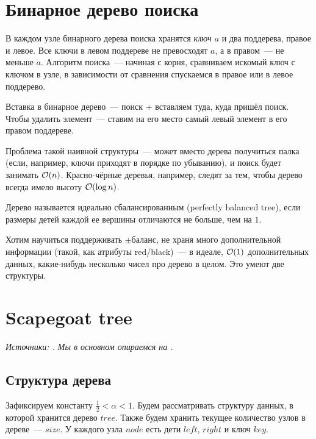 \section{Бинарное дерево поиска} 

В каждом узле бинарного дерева поиска хранятся {\it ключ $a$} и два поддерева, правое и левое. Все ключи в левом поддереве не превосходят $a$, а в правом~--- не меньше $a$. Алгоритм поиска~--- начиная с корня, сравниваем искомый ключ с ключом в узле, в зависимости от сравнения спускаемся в правое или в левое поддерево.

Вставка в бинарное дерево~--- поиск $+$ вставляем туда, куда пришёл поиск. Чтобы удалить элемент~--- ставим на его место самый левый элемент в его правом поддереве.

Проблема такой наивной структуры~--- может вместо дерева получиться палка (если, например, ключи приходят в порядке по убыванию), и поиск будет занимать $\mathcal{O}(n)$. Красно-чёрные деревья, например, следят за тем, чтобы дерево всегда имело высоту $\mathcal{O}(\log n)$.

\begin{definition}
	Дерево называется идеально сбалансированным (perfectly balanced tree), если размеры детей каждой ее вершины отличаются не больше, чем на $1$.
\end{definition}

Хотим научиться поддерживать $\pm$баланс, не храня много дополнительной информации (такой, как атрибуты red/black)~--- в идеале, $\mathcal{O}(1)$ дополнительных данных, какие-нибудь несколько чисел про дерево в целом. Это умеют две структуры.

\section{Scapegoat tree} \label{sec:scapegoat} 

 {\it Источники: \cite{galperin1993scapegoat,andersson1989improving}. Мы в основном опираемся на \cite{galperin1993scapegoat}.}

 \subsection{Структура дерева}

Зафиксируем константу $\frac{1}{2} < \alpha < 1$. Будем рассматривать структуру данных, в которой хранится дерево $tree$. Также будем хранить текущее количество узлов в дереве~--- $size$. У каждого узла $node$ есть дети $left$, $right$ и ключ $key$.

